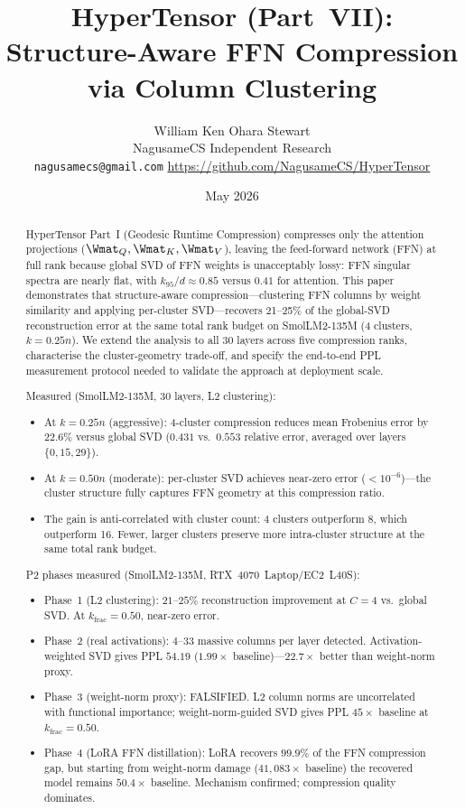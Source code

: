 \documentclass[11pt]{article}
\title{HyperTensor (Part~VII): Structure-Aware FFN Compression\\via Column Clustering}
\author{William Ken Ohara Stewart\\
\small NagusameCS Independent Research\\
\small \texttt{nagusamecs@gmail.com} \quad \url{https://github.com/NagusameCS/HyperTensor}}
\date{May 2026}
\begin{document}
\maketitle
\hypertensorbanner

\begin{abstract}
\noindent
HyperTensor Part~I (Geodesic Runtime Compression) compresses only the attention projections ($\Wmat_Q,\Wmat_K,
\Wmat_V$), leaving the feed-forward network (FFN) at full rank because
global SVD of FFN weights is unacceptably lossy: FFN singular spectra
are nearly flat, with $k_{95}/d\approx0.85$ versus $0.41$ for attention.
This paper demonstrates that structure-aware compression---clustering
FFN columns by weight similarity and applying per-cluster SVD---recovers
21--25\% of the global-SVD reconstruction error at the same
total rank budget on SmolLM2-135M (4 clusters, $k{=}0.25n$).  We extend
the analysis to all 30 layers across five compression ranks, characterise
the cluster-geometry trade-off, and specify the end-to-end PPL measurement
protocol needed to validate the approach at deployment scale.

Measured (SmolLM2-135M, 30 layers, L2 clustering):
\begin{itemize}
\item At $k{=}0.25n$ (aggressive): 4-cluster compression reduces
      mean Frobenius error by 22.6\% versus global SVD
      ($0.431$ vs.\ $0.553$ relative error, averaged over layers
      $\{0,15,29\}$).
\item At $k{=}0.50n$ (moderate): per-cluster SVD achieves near-zero
      error ($<10^{-6}$)---the cluster structure fully captures FFN
      geometry at this compression ratio.
\item The gain is anti-correlated with cluster count: 4 clusters
      outperform 8, which outperform 16.  Fewer, larger clusters
      preserve more intra-cluster structure at the same total rank
      budget.
\end{itemize}

P2 phases measured (SmolLM2-135M, RTX~4070~Laptop/EC2~L40S):
\begin{itemize}
\item Phase~1 (L2 clustering): $21$--$25\%$ reconstruction improvement at
      $C{=}4$ vs.\ global SVD.  At $k_\text{frac}{=}0.50$, near-zero error.
\item Phase~2 (real activations): $4$--$33$ massive columns per layer
      detected.  Activation-weighted SVD gives PPL $54.19$ ($1.99{\times}$
      baseline)---$22.7{\times}$ better than weight-norm proxy.
\item Phase~3 (weight-norm proxy): FALSIFIED.  L2 column norms
      are uncorrelated with functional importance; weight-norm-guided SVD
      gives PPL $45{\times}$ baseline at $k_\text{frac}{=}0.50$.
\item Phase~4 (LoRA FFN distillation): LoRA recovers $99.9\%$ of the
      FFN compression gap, but starting from weight-norm damage
      ($41{,}083{\times}$ baseline) the recovered model remains
      $50.4{\times}$ baseline.  Mechanism confirmed; compression
      quality dominates.
\end{itemize}
\end{abstract}
\end{document}
